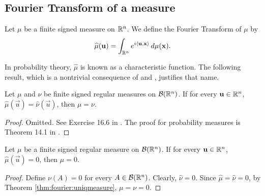 \subsection{Fourier Transform of a measure}


\begin{definition}
Let $\mu$ be a finite signed measure on ${\mathbb R}^n$. We define the Fourier Transform of $\mu$ by
\begin{align*}
    \widehat{\mu}(\mathbf{u}) = \int_{{\mathbb R}^n} e^{i \langle \mathbf{u}, \mathbf{x} \rangle } \, d\mu(\mathbf{x}).
\end{align*}
\end{definition}
\begin{remark}
In probability theory, $\widehat{\mu}$ is known as a characteristic function. The following result, which is a nontrivial consequence of  and , justifies that name.
\end{remark}
\begin{theorem}
\label{thm:fourier:uniqmeasure}
Let $\mu$ and $\nu$ be finite signed regular measures on ${\mathcal B}({\mathbb R}^n)$. If for every $\mathbf{u} \in {\mathbb R}^n$, $\widehat{\mu}(\vec{u}) = \widehat{\nu}(\vec{u})$, then $\mu = \nu$.
\end{theorem}
\begin{proof}
Omitted. See Exercise 16.6 in \cite{bass2011real}. The proof for probability measures is Theorem 14.1 in \cite{jacod_2004_probability}.
\end{proof}
\begin{corollary}
\label{corr:fourier:uniqmeasure}
Let $\mu$ be a finite signed regular measure on ${\mathcal B}({\mathbb R}^n)$. If for every $\mathbf{u} \in {\mathbb R}^n$, $\widehat{\mu}(\vec{u}) = 0$, then $\mu = 0$.
\end{corollary}

\begin{proof}
Define $\nu(A) = 0$ for every $A \in {\mathcal B}({\mathbb R}^n)$. Clearly, $\widehat{\nu} = 0$. Since $\widehat{\mu} = \widehat{\nu} = 0$, by Theorem \ref{thm:fourier:uniqmeasure}, $\mu = \nu = 0$.
\end{proof}
